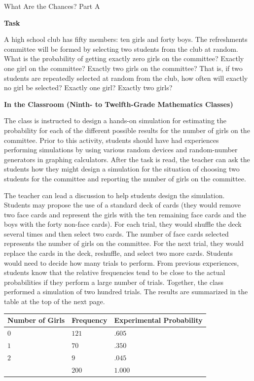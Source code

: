 \documentclass[
  10pt,
  a4paper,
  landscape,
  twoside,
  openany
]{scrbook}
\begin{document}
\TriExample
{What Are the Chances? Part A}
{
\noindent
\textbf{Task}

A high school club has fifty members: ten girls and forty boys. The refreshments committee will be formed by selecting two students from the club at random. What is the probability of getting exactly zero girls on the committee? Exactly one girl on the committee? Exactly two girls on the committee? That is, if two students are repeatedly selected at random from the club, how often will exactly no girl be selected? Exactly one girl? Exactly two girls?

\noindent
\textbf{In the Classroom (Ninth- to Twelfth-Grade Mathematics Classes)}

The class is instructed to design a hands-on simulation for estimating the probability for each of the different possible results for the number of girls on the committee. Prior to this activity, students should have had experiences performing simulations by using various random devices and random-number generators in graphing calculators. After the task is read, the teacher can ask the students how they might design a simulation for the situation of choosing two students for the committee and reporting the number of girls on the
committee.

The teacher can lead a discussion to help students design the simulation. Students may propose the use of a standard deck of cards (they would remove two face cards and represent the girls with the ten remaining face cards and the boys with the forty non-face cards). For each trial, they would shuffle the deck several times and then select two cards. The number of face cards selected represents the number of girls on the committee. For the next trial, they would replace the cards in the deck, reshuffle, and select two more cards. Students would need to decide how many trials to perform. From previous experiences, students know that the relative frequencies tend to be close to the actual probabilities if they perform a large number of trials. Together, the class performed a simulation of two hundred trials. The results are summarized in the table at the top of the next page.

\begin{center}
\begin{tabular}{|
>{\centering\arraybackslash}m{1.8cm}|
>{\centering\arraybackslash}m{1.8cm}|
>{\centering\arraybackslash}m{3.0cm}|}
\hline
Number of Girls & Frequency & Experimental Probability \\
\hline
$0$ & $121$ & $.605$ \\
\hline
$1$ & $70$  & $.350$ \\
\hline
$2$ & $9$   & $.045$ \\
\hline
    & $200$ & $1.000$ \\
\hline
\end{tabular}
\end{center}

}
\end{document}
